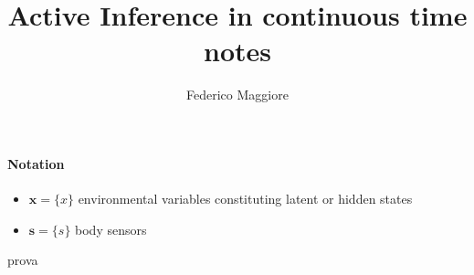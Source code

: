 \documentclass[a4paper]{article}
\title{Active Inference in continuous time notes}
\author{Federico Maggiore}
\begin{document}

\maketitle

\paragraph{\large\textbf{Notation\\}}
\begin{itemize}

\item $\mathbf x = \lbrace{ x \rbrace}$ environmental variables constituting latent or hidden states

\item $\mathbf{s} = \lbrace{ s \rbrace}$ body sensors 



\end{itemize}



prova
\end{document}
